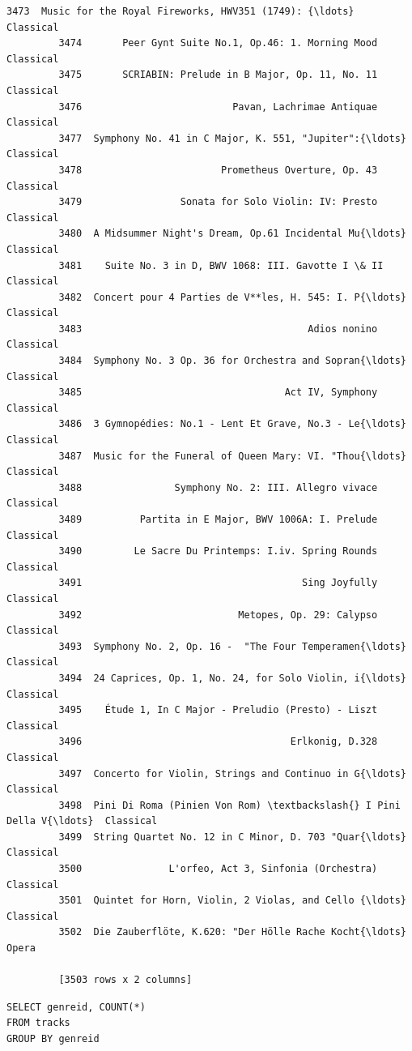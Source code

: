 \documentclass[11pt]{article}
\begin{document}
\begin{Verbatim}[commandchars=\\\{\}]
         3473  Music for the Royal Fireworks, HWV351 (1749): {\ldots}  Classical
         3474       Peer Gynt Suite No.1, Op.46: 1. Morning Mood  Classical
         3475       SCRIABIN: Prelude in B Major, Op. 11, No. 11  Classical
         3476                          Pavan, Lachrimae Antiquae  Classical
         3477  Symphony No. 41 in C Major, K. 551, "Jupiter":{\ldots}  Classical
         3478                        Prometheus Overture, Op. 43  Classical
         3479                 Sonata for Solo Violin: IV: Presto  Classical
         3480  A Midsummer Night's Dream, Op.61 Incidental Mu{\ldots}  Classical
         3481    Suite No. 3 in D, BWV 1068: III. Gavotte I \& II  Classical
         3482  Concert pour 4 Parties de V**les, H. 545: I. P{\ldots}  Classical
         3483                                       Adios nonino  Classical
         3484  Symphony No. 3 Op. 36 for Orchestra and Sopran{\ldots}  Classical
         3485                                   Act IV, Symphony  Classical
         3486  3 Gymnopédies: No.1 - Lent Et Grave, No.3 - Le{\ldots}  Classical
         3487  Music for the Funeral of Queen Mary: VI. "Thou{\ldots}  Classical
         3488                Symphony No. 2: III. Allegro vivace  Classical
         3489          Partita in E Major, BWV 1006A: I. Prelude  Classical
         3490         Le Sacre Du Printemps: I.iv. Spring Rounds  Classical
         3491                                      Sing Joyfully  Classical
         3492                           Metopes, Op. 29: Calypso  Classical
         3493  Symphony No. 2, Op. 16 -  "The Four Temperamen{\ldots}  Classical
         3494  24 Caprices, Op. 1, No. 24, for Solo Violin, i{\ldots}  Classical
         3495    Étude 1, In C Major - Preludio (Presto) - Liszt  Classical
         3496                                    Erlkonig, D.328  Classical
         3497  Concerto for Violin, Strings and Continuo in G{\ldots}  Classical
         3498  Pini Di Roma (Pinien Von Rom) \textbackslash{} I Pini Della V{\ldots}  Classical
         3499  String Quartet No. 12 in C Minor, D. 703 "Quar{\ldots}  Classical
         3500               L'orfeo, Act 3, Sinfonia (Orchestra)  Classical
         3501  Quintet for Horn, Violin, 2 Violas, and Cello {\ldots}  Classical
         3502  Die Zauberflöte, K.620: "Der Hölle Rache Kocht{\ldots}      Opera
         
         [3503 rows x 2 columns]
\end{Verbatim}
            
    \begin{verbatim}
SELECT genreid, COUNT(*) 
FROM tracks 
GROUP BY genreid
\end{verbatim}
\end{document}
